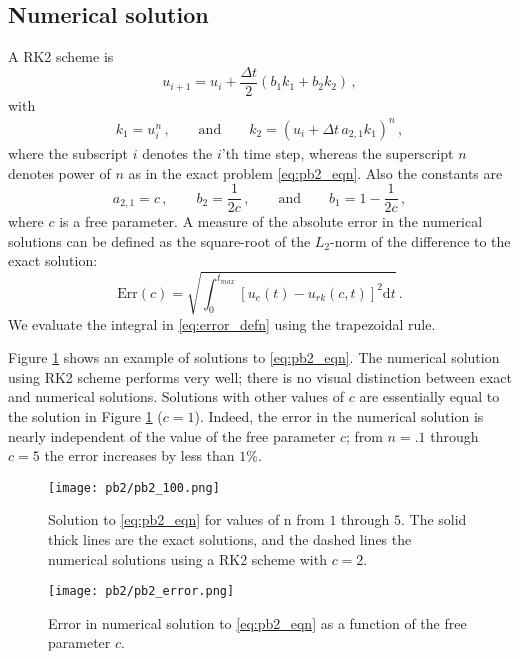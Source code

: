 \documentclass[11pt]{article}
\newcommand{\dd}{\mathrm{d}}
\newcommand{\dt}{\Delta t}
\newcommand{\com}{\, ,}
\newcommand{\per}{\, .}
\newcommand{\qqand}{\qquad \text{and} \qquad}
\def\beq{\begin{equation}}
\def\eeq{\end{equation}}
\begin{document}
\subsection*{Numerical solution}
A RK2 scheme is
\beq
\label{eq:rk2}
u_{i+1} = u_i + \frac{\dt}{2} \left(b_1 k_1 + b_2 k_2\right)\com
\eeq
with
\begin{align}
    k_1 =  u_i^n \com\qqand k_2 =  (u_i + \dt\, a_{2,1} k_1)^n\com
\end{align}
where the subscript $i$ denotes the $i$'th time step, whereas the superscript $n$ denotes power of $n$ as in the exact problem \eqref{eq:pb2_eqn}. Also the constants are
\beq
\label{eq:param_rk2}
a_{2,1} = c\com \qquad b_2 = \frac{1}{2c}\com \qqand b_1 = 1 - \frac{1}{2c}\com
\eeq
where $c$ is a free parameter. A measure of the absolute error in the numerical solutions can be defined as the square-root of the $L_2$-norm of the difference to the exact solution:
\beq
\label{eq:error_defn}
\text{Err}(c) = \sqrt{\int_0^{t_{max}}\!\!\! [u_e(t)-u_{rk}(c,t)]^2\dd t}\per
\eeq
We evaluate the integral in \eqref{eq:error_defn} using the trapezoidal rule.

Figure \ref{fig:pb2_1} shows an example of solutions to \eqref{eq:pb2_eqn}. The numerical solution using RK2 scheme performs very well; there is no visual distinction between exact and numerical solutions. Solutions with other values of $c$ are essentially equal to the solution in Figure \ref{fig:pb2_1} ($c=1$). Indeed, the error in the numerical solution is nearly independent of the value of the free parameter $c$; from $n=.1$ through $c=5$ the error increases by less than $1\%$.

\begin{figure}[ht]
\begin{center}
\texttt{[image: pb2/pb2\_100.png]}
\end{center}
\caption{Solution to \eqref{eq:pb2_eqn}  for values of n from $1$ through $5$. The solid thick lines are the exact solutions, and the dashed lines the numerical solutions using a RK2 scheme with $c=2$.}
\label{fig:pb2_1}
\end{figure}

\begin{figure}[ht]
\begin{center}
\texttt{[image: pb2/pb2\_error.png]}
\end{center}
\caption{Error in numerical solution to \eqref{eq:pb2_eqn} as a function of the free parameter $c$.}
\label{fig:pb2_error}
\end{figure}
\end{document}
